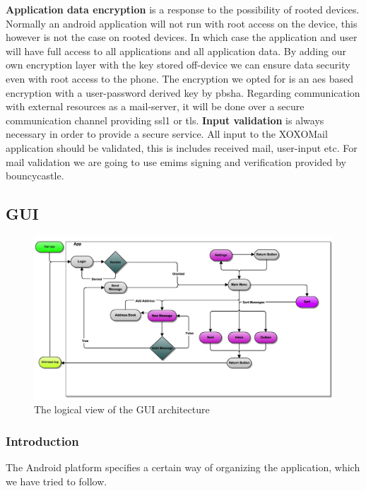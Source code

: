 \newline
\newline
\textbf{Application data encryption} is a response to the possibility of rooted devices. Normally an android application will not run with root access on the device, this however is not the case on rooted devices. In which case the application and user will have full access to all applications and all application data. By adding our own encryption layer with the key stored off-device we can ensure data security even with root access to the phone\cite{bib:tech}. The encryption we opted for is an \gls{aes} based encryption with a user-password derived key by \gls{pbsha}.
Regarding communication with external resources as a mail-server, it will be done over a secure communication channel providing \gls{ssl1} or \gls{tls}. 
\newline
\newline
\textbf{Input validation} is always necessary in order to provide a secure service. All input to the XOXOMail application should be validated, this is includes received mail, user-input etc. For mail validation we are going to use \gls{emims} signing and verification provided by bouncycastle. 

\subsection{GUI}
\begin{figure}
	\includegraphics[width=\textwidth]{Android_GUI_flow_chart_2}
	\caption{The logical view of the GUI architecture}
	\label{fig:logicalGUIview}
\end{figure}

\subsubsection{Introduction}
The Android platform specifies a certain way of organizing the application, which we have tried to follow.

